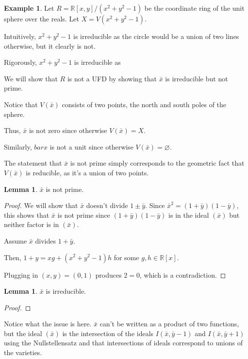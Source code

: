 \documentclass{article}
\theoremstyle{definition}
\newtheorem{lemma}[theorem]{Lemma}
\newtheorem{example}[theorem]{Example}
\begin{document}
\begin{example}

Let $ R = \mathbb{R}[x,y] / (x^{2} + y^{2} - 1) $ be the coordinate ring of the unit sphere
over the reals. Let $ X = V( x^{2} + y^{2} - 1 ) $.

Intuitively, $ x^{2} + y^{2} - 1 $ is irreducible as the circle would be a union of two lines
otherwise, but it clearly is not.

Rigorously, $ x^{2} + y^{2} - 1 $ is irreducible as %

We will show that $ R $ is not a UFD by showing that $ \bar{x} $ is irreducible
but not prime.

Notice that $ V(\bar{x}) $ consists of two points, the north and south poles of the sphere.

Thus, $ \bar{x} $ is not zero since otherwise $ V(\bar{x}) = X $.

Similarly, $ bar{x} $ is not a unit since otherwise $ V(\bar{x}) = \varnothing $. %

The statement that $ \bar{x} $ is not prime simply corresponds to the geometric fact that $ V(\bar{x}) $
is reducible, as it's a union of two points.

\begin{lemma}
    $ \bar{x} $ is not prime.
\end{lemma}
\begin{proof}
    We will show that $ \bar{x} $ doesn't divide $ 1 \pm \bar{y} $.
    Since $ \bar{x}^{2} = (1 + \bar{y})(1 - \bar{y}) $, this shows that $ \bar{x} $
    is not prime since $ (1 + \bar{y})(1 - \bar{y}) $ is in the ideal $ ( \bar{x} ) $
    but neither factor is in $ ( \bar{x} ) $.

    Assume $ \bar{x} $ divides $ 1 + \bar{y} $.

    Then, $ 1 + y = xg + (x^{2} + y^{2} - 1) h $ for some $ g,h \in \mathbb{R}[x] $.

    Plugging in $ (x,y) = (0,1) $ produces $ 2 = 0 $, which is a contradiction.
\end{proof}

\begin{lemma}
    $ \bar{x} $ is irreducible.
\end{lemma}
\begin{proof}
    
\end{proof}

Notice what the issue is here. $ \bar{x} $ can't be written as a product of two functions,
but the ideal $ ( \bar{x} ) $ is the intersection of the ideals $ I(\bar{x}, \bar{y} - 1) $
and $ I(\bar{x}, \bar{y} + 1) $ using the Nullstellensatz and that intersections of ideals
correspond to unions of the varieties.

\end{example}
\end{document}
